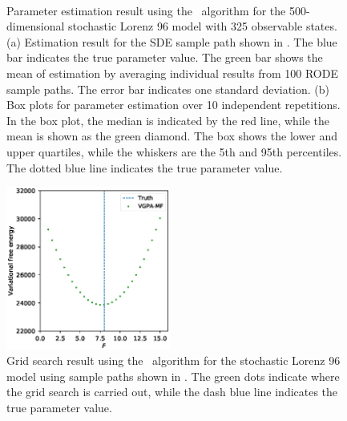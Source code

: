 \begin{figure}
\begin{subfigure}[b]{0.48\textwidth}
        \caption{\ }
        \label{fig-lorenz-96-parameters-boxplot}
    \end{subfigure}
    \caption{Parameter estimation result using the \algolpmfsde\ algorithm for the 500-dimensional stochastic Lorenz 96 model with 325 observable states. (a) Estimation result for the SDE sample path shown in . The blue bar indicates the true parameter value. The green bar shows the mean of estimation by averaging individual results from 100 RODE sample paths. The error bar indicates one standard deviation. (b) Box plots for parameter estimation over 10 independent repetitions. In the box plot, the median is indicated by the red line, while the mean is shown as the green diamond. The box shows the lower and upper quartiles, while the whiskers are the 5th and 95th percentiles. The dotted blue line indicates the true parameter value.}
    \label{fig-lorenz-96-parameters-group}    
\end{figure}

\begin{figure}
    \centering
    \includegraphics[width=0.48\textwidth]{graphics/lorenz-96-parameters-grid-search}
    \caption{Grid search result using the \algovgpamf\ algorithm for the stochastic Lorenz 96 model using sample paths shown in . The green dots indicate where the grid search is carried out, while the dash blue line indicates the true parameter value.}        
    \label{fig-lorenz-96-parameters-grid-search}
\end{figure}

